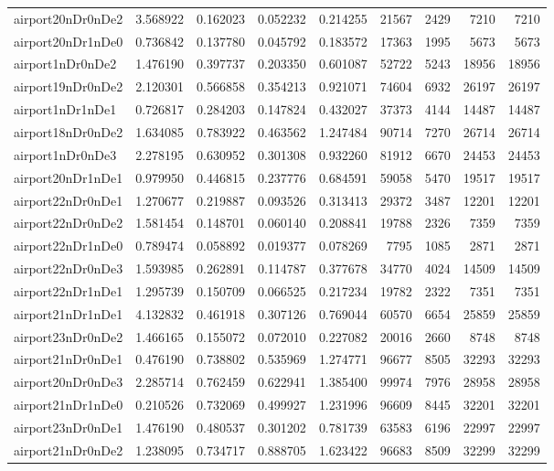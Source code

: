 \documentclass[../../../thesis.tex]{subfiles}
\begin{document}
\begin{longtable}{|l|r|r|r|r|r|r|r|r|}
airport20nDr0nDe2 & 3.568922 & 0.162023 & 0.052232 & 0.214255 & 21567 & 2429 & 7210 & 7210 \\
airport20nDr1nDe0 & 0.736842 & 0.137780 & 0.045792 & 0.183572 & 17363 & 1995 & 5673 & 5673 \\
airport1nDr0nDe2 & 1.476190 & 0.397737 & 0.203350 & 0.601087 & 52722 & 5243 & 18956 & 18956 \\
airport19nDr0nDe2 & 2.120301 & 0.566858 & 0.354213 & 0.921071 & 74604 & 6932 & 26197 & 26197 \\
airport1nDr1nDe1 & 0.726817 & 0.284203 & 0.147824 & 0.432027 & 37373 & 4144 & 14487 & 14487 \\
airport18nDr0nDe2 & 1.634085 & 0.783922 & 0.463562 & 1.247484 & 90714 & 7270 & 26714 & 26714 \\
airport1nDr0nDe3 & 2.278195 & 0.630952 & 0.301308 & 0.932260 & 81912 & 6670 & 24453 & 24453 \\
airport20nDr1nDe1 & 0.979950 & 0.446815 & 0.237776 & 0.684591 & 59058 & 5470 & 19517 & 19517 \\
airport22nDr0nDe1 & 1.270677 & 0.219887 & 0.093526 & 0.313413 & 29372 & 3487 & 12201 & 12201 \\
airport22nDr0nDe2 & 1.581454 & 0.148701 & 0.060140 & 0.208841 & 19788 & 2326 & 7359 & 7359 \\
airport22nDr1nDe0 & 0.789474 & 0.058892 & 0.019377 & 0.078269 & 7795 & 1085 & 2871 & 2871 \\
airport22nDr0nDe3 & 1.593985 & 0.262891 & 0.114787 & 0.377678 & 34770 & 4024 & 14509 & 14509 \\
airport22nDr1nDe1 & 1.295739 & 0.150709 & 0.066525 & 0.217234 & 19782 & 2322 & 7351 & 7351 \\
airport21nDr1nDe1 & 4.132832 & 0.461918 & 0.307126 & 0.769044 & 60570 & 6654 & 25859 & 25859 \\
airport23nDr0nDe2 & 1.466165 & 0.155072 & 0.072010 & 0.227082 & 20016 & 2660 & 8748 & 8748 \\
airport21nDr0nDe1 & 0.476190 & 0.738802 & 0.535969 & 1.274771 & 96677 & 8505 & 32293 & 32293 \\
airport20nDr0nDe3 & 2.285714 & 0.762459 & 0.622941 & 1.385400 & 99974 & 7976 & 28958 & 28958 \\
airport21nDr1nDe0 & 0.210526 & 0.732069 & 0.499927 & 1.231996 & 96609 & 8445 & 32201 & 32201 \\
airport23nDr0nDe1 & 1.476190 & 0.480537 & 0.301202 & 0.781739 & 63583 & 6196 & 22997 & 22997 \\
airport21nDr0nDe2 & 1.238095 & 0.734717 & 0.888705 & 1.623422 & 96683 & 8509 & 32299 & 32299 \\

\end{longtable}
\end{document}
